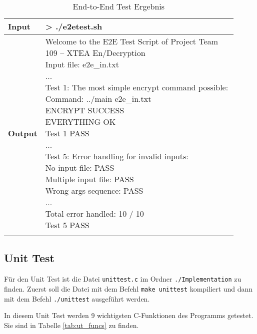 \documentclass[course=erap]{aspdoc}
\begin{document}
{\centering
\footnotesize    
\begin{longtable}{p{0.06\linewidth}p{0.85\linewidth}}
    
    \toprule[2pt]
    \textbf{Input}  &  > ./e2etest.sh  \\
    \midrule
    
    \textbf{Output}   &  \makecell[l]{
    Welcome to the E2E Test Script of Project Team 109 -- XTEA En/Decryption\\
    Input file: e2e\_in.txt\\
    ...\\
    Test 1: The most simple encrypt command possible:\\
    Command: ../main e2e\_in.txt\\
    ENCRYPT SUCCESS\\
    EVERYTHING OK\\
    Test 1 PASS\\
    ...\\
    Test 5: Error handling for invalid inputs:\\
    No input file: PASS\\
    Multiple input file: PASS\\
    Wrong args sequence: PASS\\
    ...\\
    Total error handled: 10 / 10\\
    Test 5 PASS} \\

    \bottomrule[2pt] 
    \caption{End-to-End Test Ergebnis}
    \label{tab:e2e}\\
\end{longtable}}


\subsection{Unit Test}


Für den Unit Test ist die Datei \lstinline{unittest.c} im Ordner \lstinline{./Implementation} zu finden. Zuerst soll die Datei mit dem Befehl \lstinline{make unittest} kompiliert und dann mit dem Befehl \lstinline{./unittest} ausgeführt werden.


In diesem Unit Test werden 9 wichtigsten C-Funktionen des Programms getestet. Sie sind in Tabelle \ref{tab:ut_funcs} zu finden.
\end{document}
